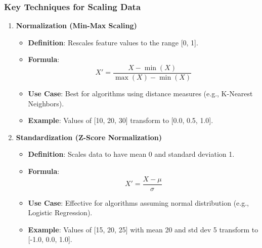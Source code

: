 \documentclass[aspectratio=169]{beamer}
\begin{document}
\begin{frame}[fragile]
  \frametitle{Key Techniques for Scaling Data}
  
  \begin{enumerate}
    \item \textbf{Normalization (Min-Max Scaling)}
      \begin{itemize}
        \item \textbf{Definition}: Rescales feature values to the range [0, 1].
        \item \textbf{Formula}:
        \begin{equation}
          X' = \frac{X - \min(X)}{\max(X) - \min(X)}
        \end{equation}
        \item \textbf{Use Case}: Best for algorithms using distance measures (e.g., K-Nearest Neighbors).
        \item \textbf{Example}: Values of [10, 20, 30] transform to [0.0, 0.5, 1.0].
      \end{itemize}
    
    \item \textbf{Standardization (Z-Score Normalization)}
      \begin{itemize}
        \item \textbf{Definition}: Scales data to have mean 0 and standard deviation 1.
        \item \textbf{Formula}:
        \begin{equation}
          X' = \frac{X - \mu}{\sigma}
        \end{equation}
        \item \textbf{Use Case}: Effective for algorithms assuming normal distribution (e.g., Logistic Regression).
        \item \textbf{Example}: Values of [15, 20, 25] with mean 20 and std dev 5 transform to [-1.0, 0.0, 1.0].
      \end{itemize}
  \end{enumerate}
\end{frame}
\end{document}
